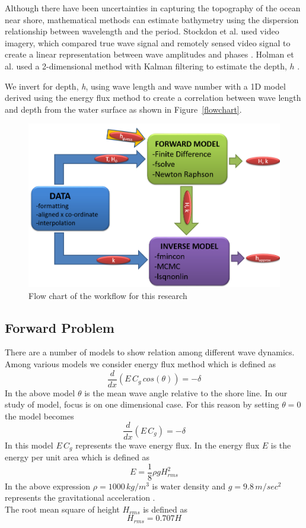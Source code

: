 Although there have been uncertainties in capturing the topography of the ocean near shore, mathematical methods can estimate bathymetry using the dispersion relationship between wavelength and the period. Stockdon et al. used video imagery, which compared true wave signal and remotely sensed video signal to create a linear representation between wave amplitudes and phases \citep{stockdon2000}.  Holman et al. used a 2-dimensional method with Kalman filtering to estimate the depth, $h$ \citep{holman2013}.

We invert for depth, \textit{h}, using wave length and wave number with a 1D model derived using the energy flux method to create a correlation between wave length and depth from the water surface as shown in Figure~\ref{flowchart}.

\begin{figure}[h]
		\centering
		\includegraphics[width=.40\linewidth]{img/Flow_Chart.png}
		\caption{Flow chart of the workflow for this research}
		\label{AWAC}
\end{figure}

\subsection{Forward Problem}\label{forwardproblem}

There are a number of models to show relation among different wave dynamics. Among various models we consider energy flux method which is defined as
$${\frac{d}{dx}}\left( E\,C_{g}\,cos (\theta)\right)= -\delta$$
In the above model ${\theta}$ is the mean wave angle relative to the shore line. In our study of model, focus is on one dimensional case. For this reason by setting ${\theta=0}$ the model becomes
\begin{equation}\label{eqn:forward}
\frac{d}{dx}\left(E\,C_{g}\right)=-\delta
\end{equation} 
In this model ${E\,C_{g}}$ represents the wave energy flux. In the energy flux ${E}$ is the energy per unit area which is defined as
\begin{equation}\label{eqn:energy}
E=\frac{1}{8}\rho g H_{rms}^2
\end{equation}
In the above expression ${\rho=1000\,kg/m^3}$ is water density   and ${g=9.8 \,m/sec^2}$ represents the gravitational acceleration . \\
The root mean square of height $H_{rms}$ is defined as\\
$${H_{rms}=0.707 H}$$\\

